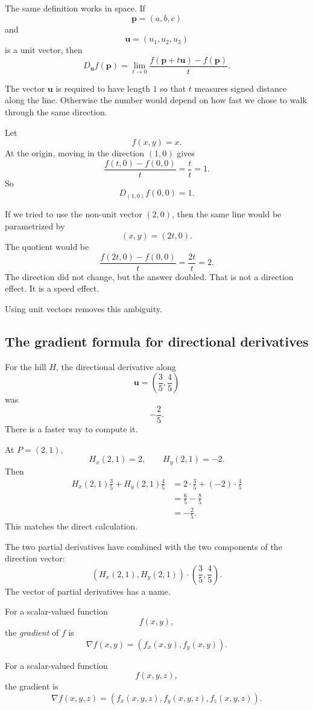 The same definition works in space.  If
\[
    \mathbf p=(a,b,c)
\]
and
\[
    \mathbf u=(u_1,u_2,u_3)
\]
is a unit vector, then
\[
\boxed{
    D_{\mathbf u}f(\mathbf p)
    =
    \lim_{t\to0}
    \frac{f(\mathbf p+t\mathbf u)-f(\mathbf p)}{t}.
}
\]

The vector \(\mathbf u\) is required to have length \(1\) so that \(t\) measures signed
distance along the line.  Otherwise the number would depend on how fast we chose to
walk through the same direction.

\begin{example}
Let
\[
    f(x,y)=x.
\]
At the origin, moving in the direction \((1,0)\) gives
\[
    \frac{f(t,0)-f(0,0)}{t}
    =
    \frac{t}{t}
    =
    1.
\]
So
\[
    D_{(1,0)}f(0,0)=1.
\]

If we tried to use the non-unit vector \((2,0)\), then the same line would be
parametrized by
\[
    (x,y)=(2t,0).
\]
The quotient would be
\[
    \frac{f(2t,0)-f(0,0)}{t}
    =
    \frac{2t}{t}
    =
    2.
\]
The direction did not change, but the answer doubled.  That is not a direction effect.
It is a speed effect.

Using unit vectors removes this ambiguity.
\end{example}

\subsection{The gradient formula for directional derivatives}

For the hill \(H\), the directional derivative along
\[
    \mathbf u=\left(\frac35,\frac45\right)
\]
was
\[
    -\frac25.
\]
There is a faster way to compute it.

At \(P=(2,1)\),
\[
    H_x(2,1)=2,
    \qquad
    H_y(2,1)=-2.
\]
Then
\[
\begin{aligned}
    H_x(2,1)\frac35+H_y(2,1)\frac45
    &=
    2\cdot\frac35+(-2)\cdot\frac45 \\
    &=
    \frac65-\frac85 \\
    &=
    -\frac25.
\end{aligned}
\]
This matches the direct calculation.

The two partial derivatives have combined with the two components of the direction
vector:
\[
    \left(H_x(2,1),H_y(2,1)\right)\cdot
    \left(\frac35,\frac45\right).
\]
The vector of partial derivatives has a name.

\begin{definition}[Gradient]
For a scalar-valued function
\[
    f(x,y),
\]
the \emph{gradient} of \(f\) is
\[
\boxed{
    \nabla f(x,y)=\left(f_x(x,y),f_y(x,y)\right).
}
\]

For a scalar-valued function
\[
    f(x,y,z),
\]
the gradient is
\[
\boxed{
    \nabla f(x,y,z)=\left(f_x(x,y,z),f_y(x,y,z),f_z(x,y,z)\right).
}
\]
\end{definition}

